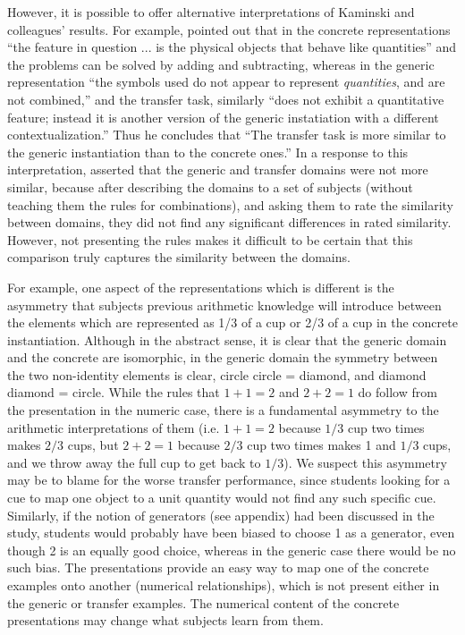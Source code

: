 \documentclass[man,10pt]{apa6}
\begin{document}
However, it is possible to offer alternative interpretations of Kaminski and colleagues' results. For example,  pointed out that in the concrete representations ``the feature in question ... is the physical objects that behave like quantities'' and the problems can be solved by adding and subtracting, whereas in the generic representation ``the symbols used do not appear to represent \emph{quantities}, and are not combined,'' and the transfer task, similarly ``does not exhibit a quantitative feature; instead it is another version of the generic instatiation with a different contextualization.'' Thus he concludes that ``The transfer task is more similar to the generic instantiation than to the concrete ones.'' In a response to this interpretation,  asserted that the generic and transfer domains were not more similar, because after describing the domains to a set of subjects (without teaching them the rules for combinations), and asking them to rate the similarity between domains, they did not find any significant differences in rated similarity. However, not presenting the rules makes it difficult to be certain that this comparison truly captures the similarity between the domains. \par
For example, one aspect of the representations which is different is the asymmetry that subjects previous arithmetic knowledge will introduce between the elements which are represented as 1/3 of a cup or 2/3 of a cup in the concrete instantiation. Although in the abstract sense, it is clear that the generic domain and the concrete are isomorphic, in the generic domain the symmetry between the two non-identity elements is clear, circle circle = diamond, and diamond diamond = circle. While the rules that $1+1=2$ and $2+2=1$ do follow from the presentation in the numeric case, there is a fundamental asymmetry to the arithmetic interpretations of them (i.e. $1+1 = 2$ because $1/3$ cup two times makes $2/3$ cups, but $2+2 = 1$ because $2/3$ cup two times makes 1 and $1/3$ cups, and we throw away the full cup to get back to $1/3$). We suspect this asymmetry may be to blame for the worse transfer performance, since students looking for a cue to map one object to a unit quantity would not find any such specific cue. Similarly, if the notion of generators (see appendix) had been discussed in the study, students would probably have been biased to choose 1 as a generator, even though 2 is an equally good choice, whereas in the generic case there would be no such bias. The presentations provide an easy way to map one of the concrete examples onto another (numerical relationships), which is not present either in the generic or transfer examples. The numerical content of the concrete presentations may change what subjects learn from them. \par
\end{document}
